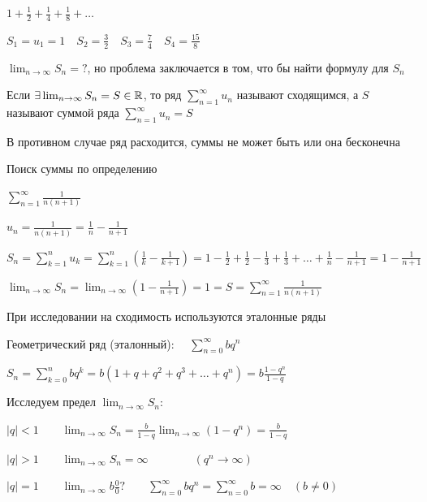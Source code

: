 \documentclass[12pt]{article}
\begin{document}
    \Ex $1 + \frac{1}{2} + \frac{1}{4} + \frac{1}{8} + \dots$

    $S_1 = u_1 = 1 \quad S_2 = \frac{3}{2} \quad S_3 = \frac{7}{4} \quad S_4 = \frac{15}{8}$

    $\lim_{n \to \infty} S_n = ?$, но проблема заключается в том, что бы найти формулу для $S_n$

    \hypertarget{sumofseriesdefinition}{}
    \hypertarget{seriesconvergence}{}

    \Def Если $\exists \lim_{n \to\infty} S_n = S \in \mathbb{R}$, то ряд $\sum_{n = 1}^\infty u_n$ называют сходящимся,
    а $S$ называют суммой ряда $\sum_{n = 1}^\infty u_n = S$

    \Notas В противном случае ряд расходится, суммы не может быть или она бесконечна

    \Ex Поиск суммы по определению

    $\sum_{n = 1}^\infty \frac{1}{n (n + 1)}$

    $u_n = \frac{1}{n(n + 1)} = \frac{1}{n} - \frac{1}{n + 1}$

    $S_n = \sum_{k = 1}^n u_k = \sum_{k = 1}^n \left(\frac{1}{k} - \frac{1}{k + 1}\right) = 1 - \frac{1}{2} + \frac{1}{2} - \frac{1}{3} + \frac{1}{3} + \dots + \frac{1}{n} - \frac{1}{n + 1} = 1 - \frac{1}{n + 1}$

    $\lim_{n \to \infty} S_n = \lim_{n \to \infty} \left(1 - \frac{1}{n + 1}\right) = 1 = S = \sum_{n = 1}^\infty \frac{1}{n(n + 1)}$

    \hypertarget{referenceseries}{}
    
    \Nota При исследовании на сходимость используются эталонные ряды

    \hypertarget{geometricseries}{}

    \Ex Геометрический ряд (эталонный): \ \ $\sum_{n = 0}^\infty b q^n$

    $S_n = \sum_{k = 0}^n b q^k = b (1 + q + q^2 + q^3 + \dots + q^n) = b \frac{1 - q^n}{1 - q}$

    Исследуем предел $\lim_{n\to\infty} S_n$:

    $|q| < 1 \quad\quad \lim_{n\to\infty} S_n = \frac{b}{1 - q} \lim_{n \to\infty} (1 - q^n) = \frac{b}{1 - q}$

    $|q| > 1 \quad\quad \lim_{n\to\infty} S_n = \infty \qquad\qquad (q^n \to\infty)$

    $|q| = 1 \quad\quad \lim_{n\to\infty} b \frac{0}{0} ? \quad\quad \sum_{n = 0}^\infty b q^n = \sum_{n = 0}^\infty b = \infty \quad (b \neq 0)$
\end{document}

